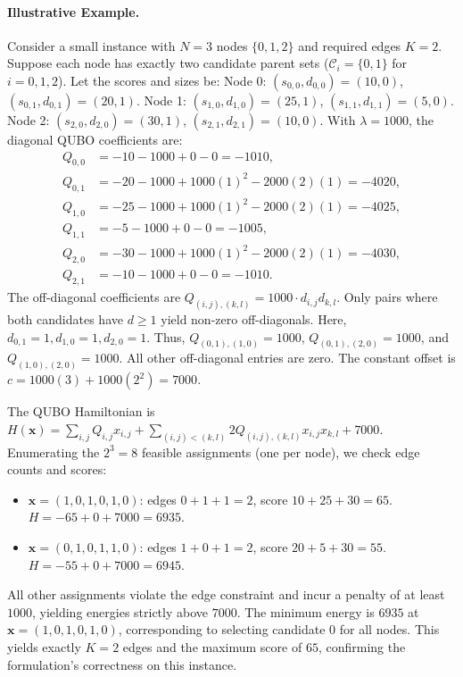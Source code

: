 \documentclass[12pt]{article}
\begin{document}
\paragraph{Illustrative Example.}
Consider a small instance with $N=3$ nodes $\{0,1,2\}$ and required edges $K=2$. Suppose each node has exactly two candidate parent sets ($\mathcal{C}_i = \{0,1\}$ for $i=0,1,2$). Let the scores and sizes be:
Node 0: $(s_{0,0}, d_{0,0}) = (10, 0)$, $(s_{0,1}, d_{0,1}) = (20, 1)$.
Node 1: $(s_{1,0}, d_{1,0}) = (25, 1)$, $(s_{1,1}, d_{1,1}) = (5, 0)$.
Node 2: $(s_{2,0}, d_{2,0}) = (30, 1)$, $(s_{2,1}, d_{2,1}) = (10, 0)$.
With $\lambda = 1000$, the diagonal QUBO coefficients are:
\begin{align}
    Q_{0,0} &= -10 - 1000 + 0 - 0 = -1010, \\
    Q_{0,1} &= -20 - 1000 + 1000(1)^2 - 2000(2)(1) = -4020, \\
    Q_{1,0} &= -25 - 1000 + 1000(1)^2 - 2000(2)(1) = -4025, \\
    Q_{1,1} &= -5 - 1000 + 0 - 0 = -1005, \\
    Q_{2,0} &= -30 - 1000 + 1000(1)^2 - 2000(2)(1) = -4030, \\
    Q_{2,1} &= -10 - 1000 + 0 - 0 = -1010.
\end{align}
The off-diagonal coefficients are $Q_{(i,j),(k,l)} = 1000 \cdot d_{i,j} d_{k,l}$. Only pairs where both candidates have $d \ge 1$ yield non-zero off-diagonals. Here, $d_{0,1}=1, d_{1,0}=1, d_{2,0}=1$. Thus, $Q_{(0,1),(1,0)} = 1000$, $Q_{(0,1),(2,0)} = 1000$, and $Q_{(1,0),(2,0)} = 1000$. All other off-diagonal entries are zero. The constant offset is $c = 1000(3) + 1000(2^2) = 7000$.

The QUBO Hamiltonian is $H(\mathbf{x}) = \sum_{i,j} Q_{i,j} x_{i,j} + \sum_{(i,j) < (k,l)} 2 Q_{(i,j),(k,l)} x_{i,j} x_{k,l} + 7000$. Enumerating the $2^3=8$ feasible assignments (one per node), we check edge counts and scores:
\begin{itemize}
    \item $\mathbf{x} = (1,0,1,0,1,0)$: edges $0+1+1=2$, score $10+25+30=65$. $H = -65 + 0 + 7000 = 6935$.
    \item $\mathbf{x} = (0,1,0,1,1,0)$: edges $1+0+1=2$, score $20+5+30=55$. $H = -55 + 0 + 7000 = 6945$.
\end{itemize}
All other assignments violate the edge constraint and incur a penalty of at least $1000$, yielding energies strictly above $7000$. The minimum energy is $6935$ at $\mathbf{x} = (1,0,1,0,1,0)$, corresponding to selecting candidate 0 for all nodes. This yields exactly $K=2$ edges and the maximum score of $65$, confirming the formulation's correctness on this instance.
\end{document}
